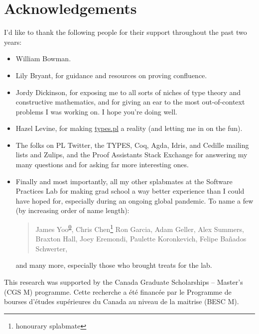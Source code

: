 \chapter{Acknowledgements}

I'd like to thank the following people for their support throughout the past two years:

\begin{itemize}
  \item William Bowman.
  \item Lily Bryant, for guidance and resources on proving confluence.
  \item Jordy Dickinson, for exposing me to all sorts of niches of type theory and constructive mathematics,
    and for giving an ear to the most out-of-context problems I was working on.
    I hope you're doing well.
  \item Hazel Levine, for making \href{https://types.pl/}{types.pl} a reality (and letting me in on the fun).
  \item The folks on PL Twitter, the TYPES, Coq, Agda, Idris, and Cedille mailing lists and Zulips,
    and the Proof Assistants Stack Exchange for answering my many questions
    and for asking far more interesting ones.
  \item Finally and most importantly, all my other splabmates at the Software Practices Lab
    for making grad school a way better experience than I could have hoped for,
    especially during an ongoing global pandemic.
    To name a few (by increasing order of name length):
    \begin{quote}
    James Yoo\textsuperscript{\href{https://youtu.be/dQw4w9WgXcQ}{0}}, Chris Chen\punctstack{,}\footnote{honourary splabmate}
    Ron Garcia, Adam Geller, Alex Summers, Braxton Hall, Joey Eremondi, Paulette Koronkevich, Felipe Ba\~nados Schwerter,
    \end{quote}
    and many more, especially those who brought treats for the lab.
\end{itemize}

\vfill

This research was supported by the Canada Graduate Scholarships -- Master’s (CGS M) programme.
Cette recherche a \'et\'e financ\'ee par le Programme de bourses d'\'etudes sup\'erieures
du Canada au niveau de la maitrise (BESC M).

\hfill